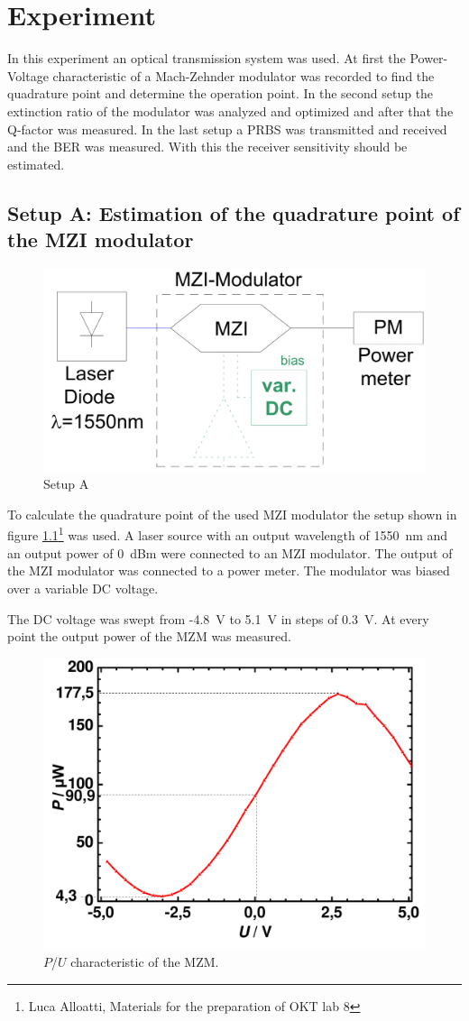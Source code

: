 \chapter{Experiment}
In this experiment an optical transmission system was used. At first the Power-Voltage characteristic of a Mach-Zehnder modulator was recorded to find the quadrature point and determine the operation point. In the second setup the extinction ratio of the modulator was analyzed and optimized and after that the Q-factor was measured. In the last setup a PRBS was transmitted and received and the BER was measured. With this the receiver sensitivity should be estimated.  

\section{Setup A: Estimation of the quadrature point of the MZI modulator}


\begin{figure}[t]%
\centering
\includegraphics[width=.5\columnwidth]{Grafiken/SetupA.png}%
\caption{Setup A}%
\label{fig:A_setup}%
\end{figure}



To calculate the quadrature point of the used MZI modulator the setup shown in figure \ref{fig:A_setup}\footnote[3]{Luca Alloatti, Materials for the preparation of OKT lab 8} was used. A laser source with an output wavelength of 1550~nm and an output power of 0~dBm were connected to an MZI modulator. The output of the MZI modulator was connected to a power meter. The modulator was biased over a variable DC voltage.

The DC voltage was swept from -4.8~V to 5.1~V in steps of 0.3~V. At every point the output power of the MZM was measured.

\begin{figure}%
\centering
\includegraphics[width=.6\columnwidth]{Grafiken/A_quadratur.pdf}%
\caption{$P$/$U$ characteristic of the MZM.}%
\label{fig:A_quadratur}%
\end{figure}

